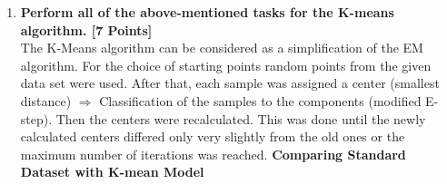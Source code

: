 \documentclass[a4paper]{article}
\begin{document}
\begin{enumerate}
\newpage

\item \textbf{Perform all of the above-mentioned tasks for the K-means algorithm. [7 Points]} \\ \newline
The K-Means algorithm can be considered as a simplification of the EM algorithm. For the choice of starting points random points from the given data set were used. After that, each sample was assigned a center (smallest distance) $\Rightarrow$ Classification of the samples to the components (modified E-step).
Then the centers were recalculated. This was done until the newly calculated centers differed only very slightly from the old ones or the maximum number of iterations was reached.
\newline
\newline
{\large \textbf{Comparing Standard Dataset with K-mean Model}} \\

  

\end{enumerate}
\end{document}
